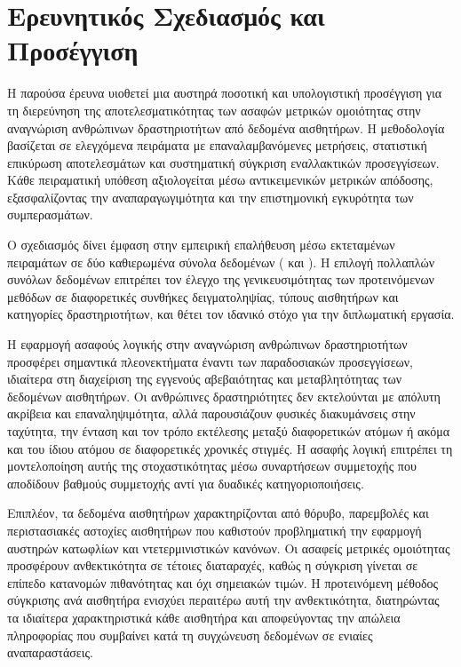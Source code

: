 \section{Ερευνητικός Σχεδιασμός και Προσέγγιση}
Η παρούσα έρευνα υιοθετεί μια αυστηρά ποσοτική και υπολογιστική προσέγγιση για τη διερεύνηση
της αποτελεσματικότητας των ασαφών μετρικών ομοιότητας στην αναγνώριση ανθρώπινων
δραστηριοτήτων από δεδομένα αισθητήρων.
Η μεθοδολογία βασίζεται σε ελεγχόμενα πειράματα με επαναλαμβανόμενες μετρήσεις, στατιστική
επικύρωση αποτελεσμάτων και συστηματική σύγκριση εναλλακτικών προσεγγίσεων.
Κάθε πειραματική υπόθεση αξιολογείται μέσω αντικειμενικών μετρικών απόδοσης, εξασφαλίζοντας
την αναπαραγωγιμότητα και την επιστημονική εγκυρότητα των συμπερασμάτων.

Ο σχεδιασμός δίνει έμφαση στην εμπειρική επαλήθευση μέσω εκτεταμένων πειραμάτων σε δύο
καθιερωμένα σύνολα δεδομένων ( και ).
Η επιλογή πολλαπλών συνόλων δεδομένων επιτρέπει τον έλεγχο της γενικευσιμότητας των
προτεινόμενων μεθόδων σε διαφορετικές συνθήκες δειγματοληψίας, τύπους αισθητήρων και
κατηγορίες δραστηριοτήτων, και θέτει τον ιδανικό στόχο για την διπλωματική εργασία.

Η εφαρμογή ασαφούς λογικής στην αναγνώριση ανθρώπινων δραστηριοτήτων προσφέρει σημαντικά
πλεονεκτήματα έναντι των παραδοσιακών προσεγγίσεων, ιδιαίτερα στη διαχείριση της εγγενούς
αβεβαιότητας και μεταβλητότητας των δεδομένων αισθητήρων.
Οι ανθρώπινες δραστηριότητες δεν εκτελούνται με απόλυτη ακρίβεια και επαναληψιμότητα, αλλά
παρουσιάζουν φυσικές διακυμάνσεις στην ταχύτητα, την ένταση και τον τρόπο εκτέλεσης μεταξύ
διαφορετικών ατόμων ή ακόμα και του ίδιου ατόμου σε διαφορετικές χρονικές στιγμές.
Η ασαφής λογική επιτρέπει τη μοντελοποίηση αυτής της στοχαστικότητας μέσω συναρτήσεων
συμμετοχής που αποδίδουν βαθμούς συμμετοχής αντί για δυαδικές κατηγοριοποιήσεις.

Επιπλέον, τα δεδομένα αισθητήρων χαρακτηρίζονται από θόρυβο, παρεμβολές και
περιστασιακές αστοχίες αισθητήρων που καθιστούν προβληματική την εφαρμογή αυστηρών κατωφλίων
και ντετερμινιστικών κανόνων.
Οι ασαφείς μετρικές ομοιότητας προσφέρουν ανθεκτικότητα σε τέτοιες διαταραχές, καθώς η
σύγκριση γίνεται σε επίπεδο κατανομών πιθανότητας και όχι σημειακών τιμών.
Η προτεινόμενη μέθοδος σύγκρισης ανά αισθητήρα ενισχύει περαιτέρω αυτή την ανθεκτικότητα,
διατηρώντας τα ιδιαίτερα χαρακτηριστικά κάθε αισθητήρα και αποφεύγοντας την απώλεια
πληροφορίας που συμβαίνει κατά τη συγχώνευση δεδομένων σε ενιαίες αναπαραστάσεις.

